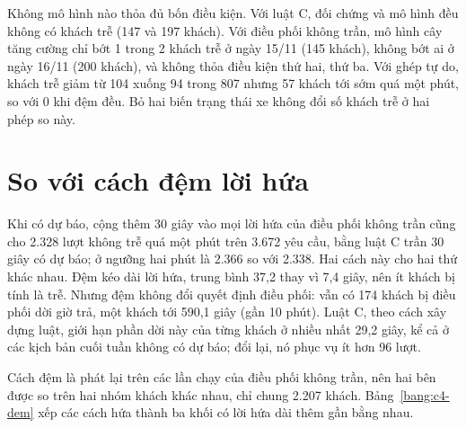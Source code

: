 Không mô hình nào thỏa đủ bốn điều kiện. Với luật C, đối chứng và mô hình đều không có khách trễ (147 và 197 khách).
Với điều phối không trần, mô hình cây tăng cường chỉ bớt 1 trong 2 khách trễ ở ngày 15/11 (145 khách), không bớt ai ở
ngày 16/11 (200 khách), và không thỏa điều kiện thứ hai, thứ ba. Với ghép tự do, khách trễ giảm từ 104 xuống 94 trong 807
nhưng 57 khách tới sớm quá một phút, so với 0 khi đệm đều. Bỏ hai biến trạng thái xe không đổi số khách trễ ở hai phép
so này.

\section{So với cách đệm lời hứa}
\label{muc:c4-dem}

Khi có dự báo, cộng thêm 30 giây vào mọi lời hứa của điều phối không trần cũng cho 2.328 lượt không trễ quá một phút
trên 3.672 yêu cầu, bằng luật C trần 30 giây có dự báo; ở ngưỡng hai phút là 2.366 so với 2.338. Hai cách này cho hai
thứ khác nhau. Đệm kéo dài lời hứa, trung bình 37,2 thay vì 7,4 giây, nên ít khách bị tính là trễ. Nhưng đệm không đổi
quyết định điều phối: vẫn có 174 khách bị điều phối dời giờ trả, một khách tới 590,1 giây (gần 10 phút). Luật C, theo cách
xây dựng luật, giới hạn phần dời này của từng khách ở nhiều nhất 29,2 giây, kể cả ở các kịch bản cuối tuần không có dự
báo; đổi lại, nó phục vụ ít hơn 96 lượt.

Cách đệm là phát lại trên các lần chạy của điều phối không trần, nên hai bên được so trên hai nhóm khách khác nhau, chỉ
chung 2.207 khách. Bảng~\ref{bang:c4-dem} xếp các cách hứa thành ba khối có lời hứa dài thêm gần bằng nhau.

